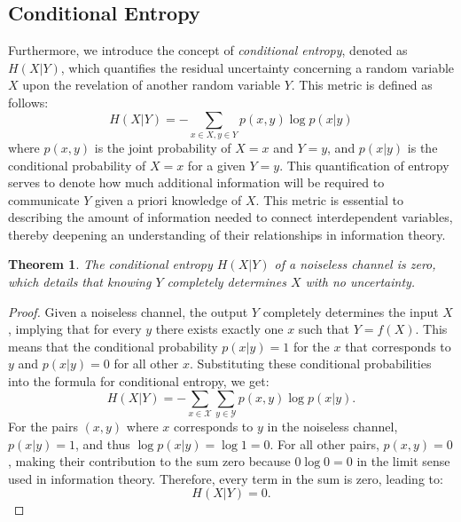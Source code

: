 \documentclass[12pt]{article}
\newtheorem{theorem}{Theorem}
\begin{document}
		
		\subsection{Conditional Entropy}
		
		Furthermore, we introduce the concept of \emph{conditional entropy}, denoted as \(H(X|Y)\), which quantifies the residual uncertainty concerning a random variable  \(X\) upon the revelation of another random variable \(Y\). This metric is defined as follows:
		\[
		H(X|Y) = -\sum_{x \in X, y \in Y} p(x, y) \log p(x|y)
		\]
		where \(p(x, y)\) is the joint probability of \(X=x\) and \(Y=y\), and \( p(x|y) \) is the conditional probability of \(X = x\) for a given \(Y = y\). This quantification of entropy serves to denote how much additional information will be required  to communicate \(Y\) given a priori knowledge of \(X\). This metric is essential to describing the amount of information needed to connect interdependent variables, thereby deepening an understanding of their relationships in information theory. 
		\begin{theorem}
			The conditional entropy $H(X|Y)$ of a noiseless channel is zero, which details that knowing $Y$ completely determines $X$ with no uncertainty.
		\end{theorem}
		\begin{proof}
			Given a noiseless channel, the output $Y$ completely determines the input $X$, implying that for every $y$ there exists exactly one $x$ such that $Y = f(X)$. This means that the conditional probability $p(x|y) = 1$ for the $x$ that corresponds to $y$ and $p(x|y) = 0$ for all other $x$. Substituting these conditional probabilities into the formula for conditional entropy, we get:
			\begin{equation}
				H(X|Y) = -\sum_{x \in \mathcal{X}} \sum_{y \in \mathcal{Y}} p(x, y) \log p(x|y).
			\end{equation}
			For the pairs $(x, y)$ where $x$ corresponds to $y$ in the noiseless channel, $p(x|y) = 1$, and thus $\log p(x|y) = \log 1 = 0$. For all other pairs, $p(x, y) = 0$, making their contribution to the sum zero because $0 \log 0 = 0$ in the limit sense used in information theory. Therefore, every term in the sum is zero, leading to:
			\begin{equation}
				H(X|Y) = 0.
			\end{equation}
		\end{proof}
		
	
		
\end{document}
